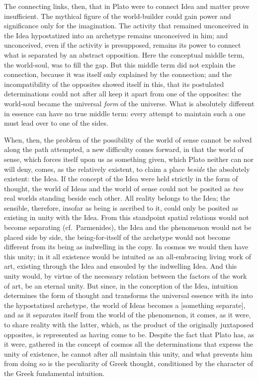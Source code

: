 The connecting links, then, that in Plato were to connect Idea and matter prove
insufficient. The mythical figure of the world-builder could gain power and significance
only for the imagination. The activity that remained unconceived in the Idea hypostatized
into an archetype remains unconceived in him; and unconceived, even if the activity is
presupposed, remains its power to connect what is separated by an abstract opposition.
Here the conceptual middle term, the world-soul, was to fill the gap. But this middle term
did not explain the connection, because it was itself only explained by the connection;
and the incompatibility of the opposites showed itself in this, that its postulated
determinations could not after all keep it apart from one of the opposites: the world-soul
became the universal \emph{form} of the universe. What is absolutely different in essence
can have no true middle term: every attempt to maintain such a one must lead over to one of
the sides.

When, then, the problem of the possibility of the world of sense cannot be solved along the
path attempted, a new difficulty comes forward, in that the world of sense, which
forces itself upon us as something given, which Plato neither can nor will deny, comes, as
the relatively existent, to claim a place \emph{beside} the absolutely existent: the Idea.
If the concept of the Idea were held strictly in the form of thought, the world of Ideas
and the world of sense could not be posited as \emph{two} real worlds standing beside each
other. All reality belongs to the Idea; the sensible, therefore, insofar as being is
ascribed to it, could only be posited as existing in unity with the Idea. From this
standpoint spatial relations would not become separating (cf.\ Parmenides), the Idea and
the phenomenon would not be placed side by side, the being-for-itself of the archetype would
not become different from its being as indwelling in the copy. In cosmos we would then have
this unity; in it all existence would be intuited as an all-embracing living work of art,
existing through the Idea and ensouled by the indwelling Idea. And this unity would, by
virtue of the necessary relation between the factors of the work of art, be an eternal
unity. But since, in the conception of the Idea, intuition determines the form of thought
and transforms the universal essence with its  into the hypostatized archetype,
the world of Ideas becomes a  [something separate], and as it separates itself
from the world of the phenomenon, it comes, as it were, to share reality with the latter,
which, as the product of the originally juxtaposed opposites, is represented as having come
to be. Despite the fact that Plato has, as it were, gathered in the concept of cosmos all
the determinations that express the unity of existence, he cannot after all maintain this
unity, and what prevents him from doing so is the peculiarity of Greek thought, conditioned
by the character of the Greek fundamental intuition.

